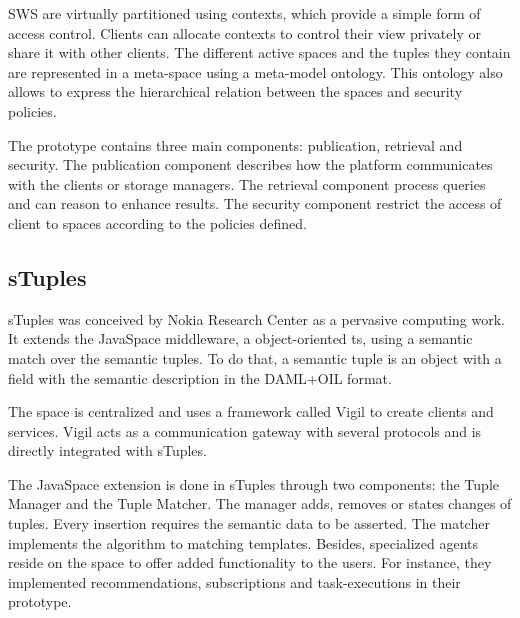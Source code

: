 SWS are virtually partitioned using contexts, which provide a simple form of access control.
Clients can allocate contexts to control their view privately or share it with other clients. %
The different active spaces and the tuples they contain are represented in a meta-space using a meta-model ontology.
This ontology also allows to express the hierarchical relation between the spaces and security policies.

The prototype contains three main components: publication, retrieval and security.
The publication component describes how the platform communicates with the clients or storage managers.
The retrieval component process queries and can reason to enhance results. %
The security component restrict the access of client to spaces according to the policies defined.  %



\subsection{sTuples}

sTuples \citep{khushraj_stuples:_2004} was conceived by Nokia Research Center as a pervasive computing work.
It extends the JavaSpace middleware, a object-oriented \acl{ts}, using a semantic match over the semantic tuples.
To do that, a semantic tuple is an object with a field with the semantic description in the DAML+OIL format. %


The space is centralized and uses a framework called Vigil to create clients and services. %
Vigil acts as a communication gateway with several protocols and is directly integrated with sTuples.


The JavaSpace extension is done in sTuples through two components: the Tuple Manager and the Tuple Matcher.
The manager adds, removes or states changes of tuples.
Every insertion requires the semantic data to be asserted.
The matcher implements the algorithm to matching templates.
Besides, specialized agents reside on the space to offer added functionality to the users.
For instance, they implemented recommendations, subscriptions and task-executions in their prototype.



